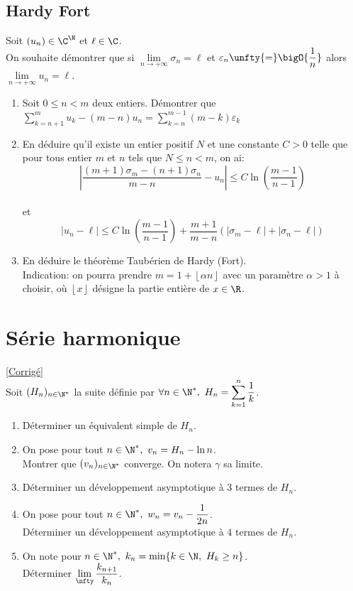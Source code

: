 \documentclass{book}
\begin{document}
	\subsection{Hardy Fort }
	Soit $(u_n)\in \C^\N$ et $\ell\in\C$.
	\\On souhaite démontrer que si $\lim\limits_{n\to+\infty} \sigma_n=\ell$ et $\varepsilon_n\unfty{=}\bigO{\displaystyle\frac{1}{n}}$ alors $\lim\limits_{n\to+\infty} u_n=\ell$.
	\begin{enumerate}[leftmargin=*]
		\item Soit $0\leq n<m$ deux entiers. Démontrer que $\displaystyle\sum\limits_{k=n+1}^mu_k-(m-n)u_n=\sum\limits_{k=n}^{m-1}(m-k)\varepsilon_k$
		\item En déduire qu'il existe un entier positif $N$ et une constante $C>0$ telle que pour tous entier $m$ et $n$ tels que $N\leq n<m$, on ai: $$\left|\displaystyle\frac{(m+1)\sigma_m-(n+1)\sigma_n}{m-n}-u_n\right|\leq C\ln\left(\frac{m-1}{n-1}\right)$$
		\\et 
		$$|u_n-\ell|\leq C\ln\left(\frac{m-1}{n-1}\right)+\frac{m+1}{m-n}(|\sigma_m-\ell|+|\sigma_n-\ell|)$$
		\item En déduire le théorème Taubérien de Hardy (Fort). \\Indication: on pourra prendre $m=1+\left\lfloor{\alpha n}\right\rfloor$ avec un paramètre $\alpha>1$ à choisir, où $\left\lfloor{x}\right\rfloor$ désigne la partie entière de $x\in\R$.
	\end{enumerate}
	
	\section{Série harmonique }
	\textcolor{blue}{\hyperref[Série harmonique corrigé]{[Corrigé]}}\\
	\label{Série harmonique}
	Soit $(H_n)_{n\in \N^*}$ la suite définie par $\forall n \in \N^*, \ H_n=\displaystyle\sum\limits_{k=1}^{n}\frac{1}{k}$.\\
	\begin{enumerate}
		\item Déterminer un équivalent simple de $H_n$.
		\item On pose pour tout $n\in \N^*,\ v_n=H_n-\ln n$.\\
		Montrer que $(v_n)_{n\in \N^*}$ converge. On notera $\gamma$ sa limite.
		\item Déterminer un développement asymptotique à $3$ termes de $H_n$.
		\item On pose pour tout $n\in \N^*,\ w_n=v_n-\displaystyle\frac{1}{2n}$.\\
		Déterminer un développement asymptotique à $4$ termes de $H_n$.
		\item On note pour $n\in \N^*,\ k_n=\min\{k\in \N,\ H_k\geq n\}$.\\
		Déterminer $\lim\limits_{\nfty}\displaystyle\frac{k_{n+1}}{k_n}$.
	\end{enumerate}
	
\end{document}
